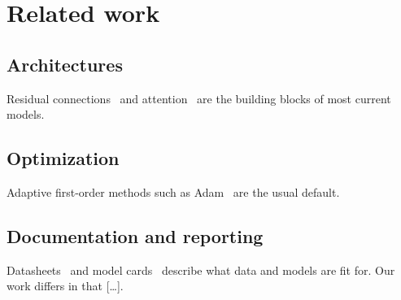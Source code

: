 \section{Related work}\label{sec:related}

\subsection*{Architectures}
Residual connections~\cite{he2016deep} and attention~\cite{vaswani2017attention} are the building blocks of most current models.

\subsection*{Optimization}
Adaptive first-order methods such as Adam~\cite{kingma2014adam} are the usual default.

\subsection*{Documentation and reporting}
Datasheets~\cite{gebru2021datasheets} and model cards~\cite{mitchell2019model} describe what data and models are fit for.
Our work differs in that [\dots].
